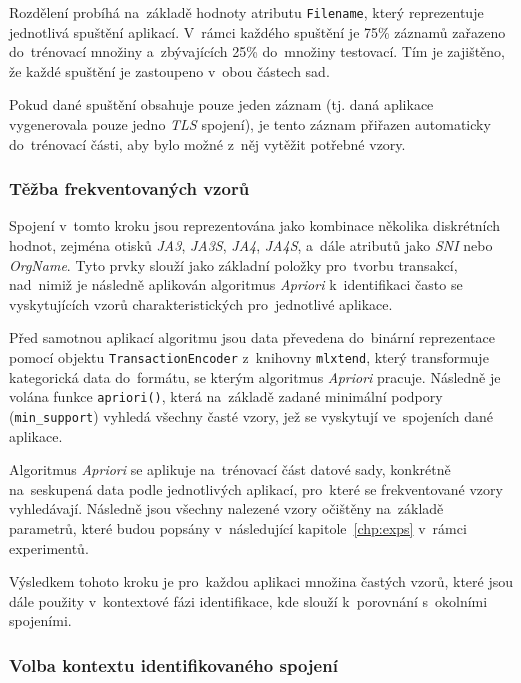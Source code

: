Rozdělení probíhá na~základě hodnoty atributu \texttt{Filename}, který reprezentuje jednotlivá spuštění aplikací. V~rámci každého spuštění je 75\% záznamů zařazeno do~trénovací množiny a~zbývajících 25\% do~množiny testovací. Tím je zajištěno, že každé spuštění je zastoupeno v~obou částech sad.

Pokud dané spuštění obsahuje pouze jeden záznam (tj. daná aplikace vygenerovala pouze jedno \textit{TLS} spojení), je tento záznam přiřazen automaticky do~trénovací části, aby bylo možné z~něj vytěžit potřebné vzory.

\subsubsection{Těžba frekventovaných vzorů}

Spojení v~tomto kroku jsou reprezentována jako kombinace několika diskrétních hodnot, zejména otisků \textit{JA3}, \textit{JA3S}, \textit{JA4}, \textit{JA4S}, a~dále atributů jako \textit{SNI} nebo \textit{OrgName}. Tyto prvky slouží jako základní položky pro~tvorbu transakcí, nad~nimiž je následně aplikován algoritmus \textit{Apriori} k~identifikaci často se vyskytujících vzorů charakteristických pro~jednotlivé aplikace.

Před samotnou aplikací algoritmu jsou data převedena do~binární reprezentace pomocí objektu \texttt{TransactionEncoder} z~knihovny \texttt{mlxtend}, který transformuje kategorická data do~formátu, se kterým algoritmus \textit{Apriori} pracuje. Následně je volána funkce \texttt{apriori()}, která na~základě zadané minimální podpory (\texttt{min\_support}) vyhledá všechny časté vzory, jež se vyskytují ve~spojeních dané aplikace.

Algoritmus \textit{Apriori} se aplikuje na~trénovací část datové sady, konkrétně na~seskupená data podle jednotlivých aplikací, pro~které se frekventované vzory vyhledávají. Následně jsou všechny nalezené vzory očištěny na~základě parametrů, které budou popsány v~následující kapitole~\ref{chp:exps} v~rámci experimentů.

Výsledkem tohoto kroku je pro~každou aplikaci množina častých vzorů, které jsou dále použity v~kontextové fázi identifikace, kde slouží k~porovnání s~okolními spojeními.

\subsubsection{Volba kontextu identifikovaného spojení}


